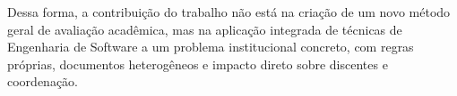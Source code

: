 Dessa forma, a contribuição do trabalho não está na criação de um novo 
método geral de avaliação acadêmica, mas na aplicação integrada de técnicas 
de Engenharia de Software a um problema institucional concreto, com regras 
próprias, documentos heterogêneos e impacto direto sobre discentes e 
coordenação.
